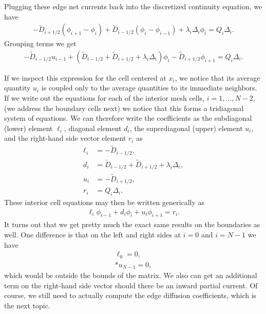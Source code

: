 Plugging these edge net currents back into the discretized continuity equation, we have
\begin{align}
  -\widetilde{D}_{i+1/2} ( \phi_{i+1} - \phi_{i} ) + \widetilde{D}_{i-1/2} ( \phi_i - \phi_{i-1} )  + \lambda_i \Delta_i \phi_i = Q_i \Delta_i .
\end{align}
Grouping terms we get
\begin{align}
 -\widetilde{D}_{i-1/2} u_{i-1} + \left( \widetilde{D}_{i-1/2} + \widetilde{D}_{i+1/2}  + \lambda_i \Delta_i \right) \phi_i - \widetilde{D}_{i+1/2} \phi_{i+1}  = Q_i \Delta_i .
\end{align}

If we inspect this expression for the cell centered at $x_i$, we notice that its average quantity $u_i$ is coupled only to the average quantities to its immediate neighbors. If we write out the equations for each of the interior mesh cells, $i=1, \ldots, N-2$, (we address the boundary cells next) we notice that this forms a tridiagonal system of equations. We can therefore write the coefficients as the subdiagonal (lower) element $\ell_i$, diagonal element $d_i$, the superdiagonal (upper) element $u_i$, and the right-hand side vector element $r_i$ as
\begin{subequations}
\begin{align}
  \ell_i	&= -\widetilde{D}_{i-1/2}, \\
  d_i		&=  \widetilde{D}_{i-1/2} + \widetilde{D}_{i+1/2}  + \lambda_i \Delta_i, \\
  u_i		&= -\widetilde{D}_{i+1/2}, \\
  r_i		&=  Q_i \Delta_i.
\end{align} 
\end{subequations}
These interior cell equations may then be written generically as
\begin{align}
  \ell_i \phi_{i-1} + d_i \phi_i + u_i \phi_{i+1} = r_i .
\end{align}
It turns out that we get pretty much the exact same results on the boundaries as well. One difference is that on the left and right sides at $i = 0$ and $i = N-1$ we have
\begin{subequations}
\begin{align}
  \ell_0  = 0, \\*
  u_{N-1} = 0,
\end{align}
\end{subequations}
which would be outside the bounds of the matrix. We also can get an additional term on the right-hand side vector should there be an inward partial current. Of course, we still need to actually compute the edge diffusion coefficients, which is the next topic.


